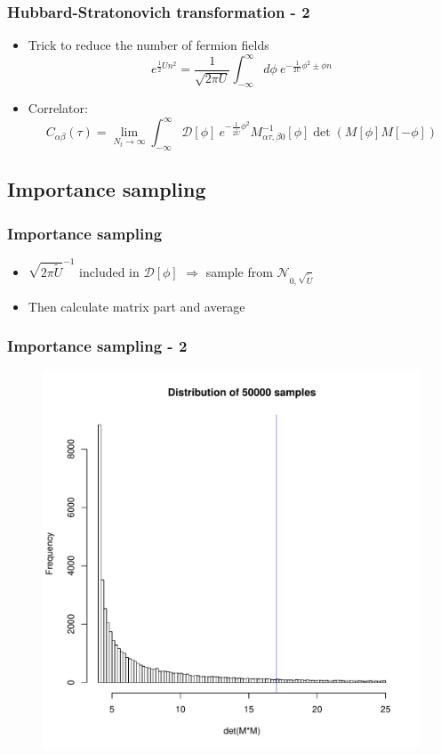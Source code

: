 \documentclass{beamer}
\begin{document}
\begin{frame}
	\frametitle{Hubbard-Stratonovich transformation - 2}
	\begin{itemize}
		
		\item Trick to reduce the number of fermion fields
		\begin{equation*}\label{linearize}
		e^{\frac{1}{2} U n^{2}}=\frac{1}{\sqrt{2 \pi U}} \int_{-\infty}^{\infty} d \phi\: e^{-\frac{1}{2 U} \phi^{2} \pm \phi n}
		\end{equation*}
		\item Correlator:
		\begin{equation*}\label{C}
		C_{\alpha\beta}(\tau) =\lim _{N_{t} \rightarrow \infty} \int_{-\infty}^{\infty} \mathcal{D}[\phi]\:e^{-\frac{1}{2 \tilde{U}} \phi^2}M^{-1}_{\alpha\tau,\beta 0}[\phi]\det(M[\phi]M[-\phi])
		\end{equation*}
	\end{itemize}
\end{frame}
\subsection{Importance sampling}
\begin{frame}
\frametitle{Importance sampling}
	\begin{itemize}
		\item  $\sqrt{2\pi\tilde{U}}^{-1}$ included in $\mathcal{D}[\phi]$ $\Rightarrow$ sample from $\mathcal{N}_{0, \sqrt{\tilde{U}}}$
		\item Then calculate matrix part and average
	
\end{itemize}
\end{frame}

\begin{frame}
	\frametitle{Importance sampling - 2}
	\begin{figure}[h]
		\centering
		\includegraphics[width=0.9\linewidth]{figs/distribution}
	\end{figure}
\end{frame}
\end{document}
